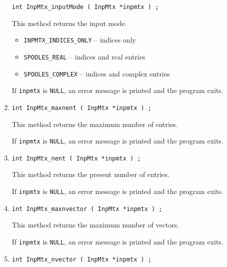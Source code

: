 \begin{enumerate}
\begin{verbatim}
int InpMtx_inputMode ( InpMtx *inpmtx ) ;
\end{verbatim}
This method returns the input mode.
\begin{itemize}
\item {\tt INPMTX\_INDICES\_ONLY} -- indices only
\item {\tt SPOOLES\_REAL} -- indices and real entries
\item {\tt SPOOLES\_COMPLEX} -- indices and complex entries
\end{itemize}
\par {}
If {\tt inpmtx} is {\tt NULL},
an error message is printed and the program exits.
\item
\begin{verbatim}
int InpMtx_maxnent ( InpMtx *inpmtx ) ;
\end{verbatim}
This method returns the maximum number of entries.
\par {}
If {\tt inpmtx} is {\tt NULL},
an error message is printed and the program exits.
\item
\begin{verbatim}
int InpMtx_nent ( InpMtx *inpmtx ) ;
\end{verbatim}
This method returns the present number of entries.
\par {}
If {\tt inpmtx} is {\tt NULL},
an error message is printed and the program exits.
\item
\begin{verbatim}
int InpMtx_maxnvector ( InpMtx *inpmtx ) ;
\end{verbatim}
This method returns the maximum number of vectors.
\par {}
If {\tt inpmtx} is {\tt NULL},
an error message is printed and the program exits.
\item
\begin{verbatim}
int InpMtx_nvector ( InpMtx *inpmtx ) ;
\end{verbatim}

\end{enumerate}
